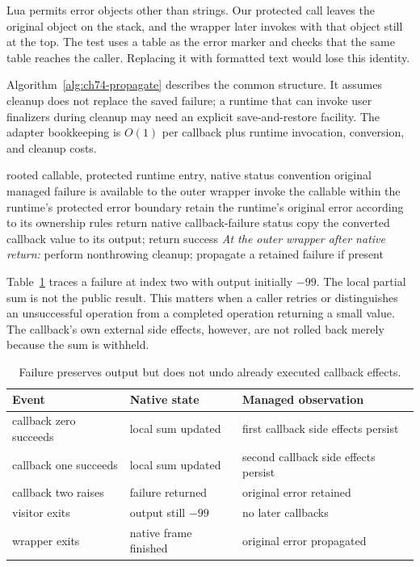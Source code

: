 Lua permits error objects other than strings.
Our protected call leaves the original object on the stack, and the wrapper later invokes  with that object still at the top.
The test uses a table as the error marker and checks that the same table reaches the caller.
Replacing it with formatted text would lose this identity.

Algorithm~\ref{alg:ch74-propagate} describes the common structure.
It assumes cleanup does not replace the saved failure; a runtime that can invoke user finalizers during cleanup may need an explicit save-and-restore facility.
The adapter bookkeeping is $O(1)$ per callback plus runtime invocation, conversion, and cleanup costs.

\begin{algorithm}[htbp]
\caption{Return through native frames before propagating a managed callback error.}
\label{alg:ch74-propagate}
\begin{pseudocode}
\Require rooted callable, protected runtime entry, native status convention
\Ensure original managed failure is available to the outer wrapper
\State invoke the callable within the runtime's protected error boundary
  \State retain the runtime's original error according to its ownership rules
  \State return native callback-failure status
\EndIf
\State copy the converted callback value to its output; return success
\Statex \textit{At the outer wrapper after native return:}
\State perform nonthrowing cleanup; propagate a retained failure if present
\end{pseudocode}
\end{algorithm}

Table~\ref{tab:ch74-trace} traces a failure at index two with output initially $-99$.
The local partial sum is not the public result.
This matters when a caller retries or distinguishes an unsuccessful operation from a completed operation returning a small value.
The callback's own external side effects, however, are not rolled back merely because the sum is withheld.

\begin{table}[htbp]
\caption{Failure preserves output but does not undo already executed callback effects.}
\label{tab:ch74-trace}
\centering
\begin{tabular}{lll}
\toprule
Event & Native state & Managed observation \\
\midrule
callback zero succeeds & local sum updated & first callback side effects persist \\
callback one succeeds & local sum updated & second callback side effects persist \\
callback two raises & failure returned & original error retained \\
visitor exits & output still $-99$ & no later callbacks \\
wrapper exits & native frame finished & original error propagated \\
\bottomrule
\end{tabular}
\end{table}

